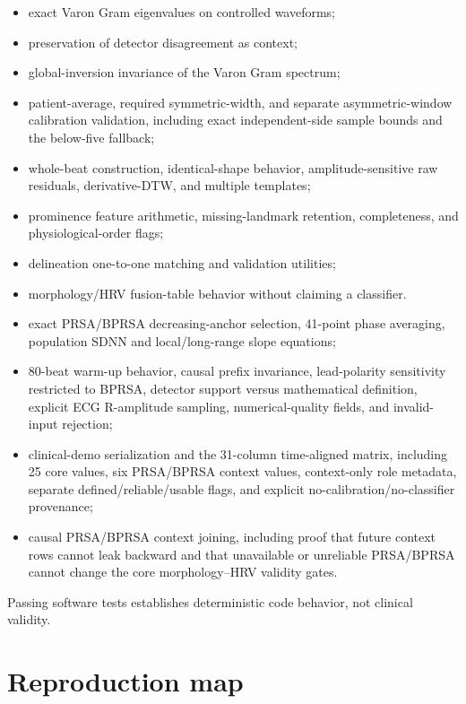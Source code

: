 \documentclass[11pt,a4paper]{article}
\begin{document}
\begin{itemize}
  \item exact Varon Gram eigenvalues on controlled waveforms;
  \item preservation of detector disagreement as context;
  \item global-inversion invariance of the Varon Gram spectrum;
  \item patient-average, required symmetric-width, and separate asymmetric-window calibration validation, including exact independent-side sample bounds and the below-five fallback;
  \item whole-beat construction, identical-shape behavior, amplitude-sensitive raw residuals, derivative-DTW, and multiple templates;
  \item prominence feature arithmetic, missing-landmark retention, completeness, and physiological-order flags;
  \item delineation one-to-one matching and validation utilities;
  \item morphology/HRV fusion-table behavior without claiming a classifier.
  \item exact PRSA/BPRSA decreasing-anchor selection, 41-point phase averaging, population SDNN and local/long-range slope equations;
  \item 80-beat warm-up behavior, causal prefix invariance, lead-polarity sensitivity restricted to BPRSA, detector support versus mathematical definition, explicit ECG R-amplitude sampling, numerical-quality fields, and invalid-input rejection;
  \item clinical-demo serialization and the 31-column time-aligned matrix, including 25 core values, six PRSA/BPRSA context values, context-only role metadata, separate defined/reliable/usable flags, and explicit no-calibration/no-classifier provenance;
  \item causal PRSA/BPRSA context joining, including proof that future context rows cannot leak backward and that unavailable or unreliable PRSA/BPRSA cannot change the core morphology--HRV validity gates.
\end{itemize}

Passing software tests establishes deterministic code behavior, not clinical validity.

\section{Reproduction map}
\label{sec:reproduction}
\end{document}
